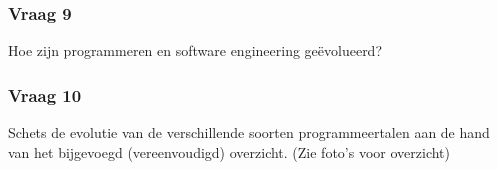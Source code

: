 \documentclass[../main.tex]{subfiles}
\begin{document}
\subsubsection{Vraag 9}
\begin{question}
Hoe zijn programmeren en software engineering geëvolueerd?
\end{question}

\subsubsection{Vraag 10}
\begin{question}
Schets de evolutie van de verschillende soorten programmeertalen aan de hand van het bijgevoegd (vereenvoudigd) overzicht. (Zie foto's voor overzicht)
\end{question}
\end{document}
